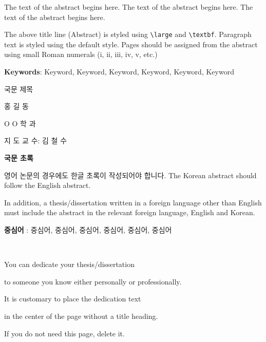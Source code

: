 \documentclass[11pt]{report}
\begin{document}
\normalsize
\justifying %
\doublespacing

The text of the abstract begins here. The text of the abstract begins here. The text of the abstract begins here. \par
The above title line (Abstract) is styled using \verb|\large| and  \verb|\textbf|.
Paragraph text is styled using the default style.
Pages should be assigned from the abstract using small Roman numerals (i, ii, iii, iv, v, etc.)

\par\vspace{20pt}
\textbf{Keywords}: Keyword, Keyword, Keyword, Keyword, Keyword, Keyword


\newpage 
\begin{center}
\LARGE 국문 제목 %
\par\vspace{20pt}
\normalsize 홍 길 동\par %
O O 학 과\par %
지 도 교 수:  김 철 수
\par\vspace{20pt}
\large \textbf{국문 초록}
\end{center}

\normalsize 

영어 논문의 경우에도 한글 초록이 작성되어야 합니다. 
The Korean abstract should follow the English abstract. \par
In addition, a thesis/dissertation written in a foreign language other than English must include the abstract in the relevant foreign language, English and Korean. 

\par \vspace{20pt}
\textbf{중심어} : 중심어, 중심어, 중심어, 중심어, 중심어, 중심어


\newpage
~
\vspace{5.5cm} \par
\begin{center}
You can dedicate your thesis/dissertation  \par 
to someone you know either personally or professionally. \par
It is customary to place the dedication text \par
in the center of the page without a title heading. \par
If you do not need this page, delete it.
\end{center}
\end{document}
